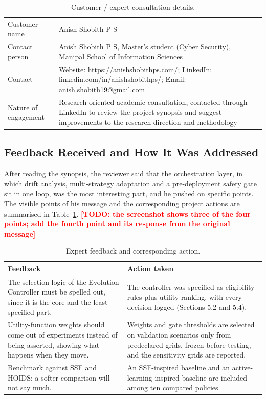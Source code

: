 \documentclass{article}
\newcommand{\todo}[1]{\textcolor{red}{\textbf{[TODO: #1]}}}
\begin{document}
\begin{table}[h]
\centering
\caption{Customer / expert-consultation details.}
\small
\begin{tabular}{p{3.5cm}p{9cm}}
\toprule
Customer name & Anish Shobith P S \\
Contact person & Anish Shobith P S, Master's student (Cyber Security), Manipal School of Information Sciences \\
Contact & Website: https://anishshobithps.com/; LinkedIn: linkedin.com/in/anishshobithps/; Email: anish.shobith19@gmail.com \\
Nature of engagement & Research-oriented academic consultation, contacted through LinkedIn to review the project synopsis and suggest improvements to the research direction and methodology \\
\bottomrule
\end{tabular}
\end{table}

\subsection{Feedback Received and How It Was Addressed}

After reading the synopsis, the reviewer said that the orchestration layer, in which drift analysis, multi-strategy adaptation and a pre-deployment safety gate sit in one loop, was the most interesting part, and he pushed on specific points. The visible points of his message and the corresponding project actions are summarised in Table~\ref{tab:feedback}. \todo{the screenshot shows three of the four points; add the fourth point and its response from the original message}

\begin{table}[h]
\centering
\caption{Expert feedback and corresponding action.}
\label{tab:feedback}
\small
\begin{tabular}{p{5.4cm}p{7.6cm}}
\toprule
Feedback & Action taken \\
\midrule
The selection logic of the Evolution Controller must be spelled out, since it is the core and the least specified part. & The controller was specified as eligibility rules plus utility ranking, with every decision logged (Sections 5.2 and 5.4). \\
Utility-function weights should come out of experiments instead of being asserted, showing what happens when they move. & Weights and gate thresholds are selected on validation scenarios only from predeclared grids, frozen before testing, and the sensitivity grids are reported. \\
Benchmark against SSF and HOIDS; a softer comparison will not say much. & An SSF-inspired baseline and an active-learning-inspired baseline are included among ten compared policies. \\
\bottomrule
\end{tabular}
\end{table}
\end{document}

